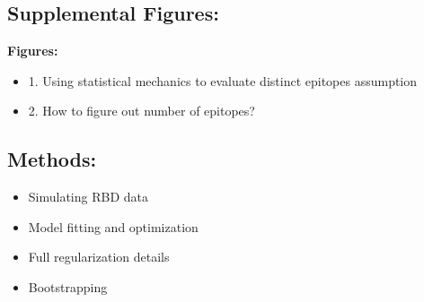 \documentclass{article}
\newcommand{\beginsupplement}{%
        \setcounter{table}{0}
        \renewcommand{\thetable}{S\arabic{table}}%
        \setcounter{figure}{0}
        \renewcommand{\thefigure}{S\arabic{figure}}%
     }
\begin{document}


\subsection*{Supplemental Figures:}
\textbf{Figures:}
\begin{itemize}
	\item 1. Using statistical mechanics to evaluate distinct epitopes assumption
	\item 2. How to figure out number of epitopes?
\end{itemize}

\subsection*{Methods:}
\begin{itemize}
	\item Simulating RBD data
	\item Model fitting and optimization
	\item Full regularization details
	\item Bootstrapping
\end{itemize}







\end{document}
